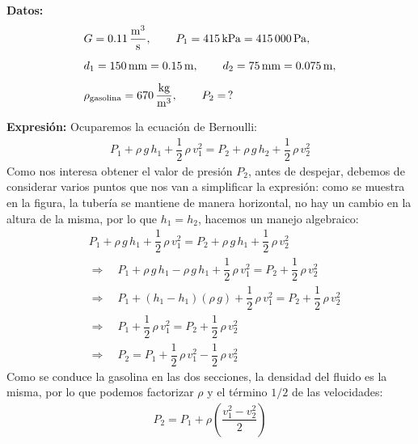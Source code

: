 \documentclass[14pt]{extarticle}
\begin{document}
\begin{enumerate}
\textbf{Datos:} 
\begin{align*}
&G = \displaystyle \SI[per-mode=fraction]{0.11}{\cubic\meter\per\second}, \hspace{0.75cm} P_{1} = \SI{415}{\kilo\pascal} = \SI{415000}{\pascal}, \\[0.5em]
&d_{1} = \SI{150}{\milli\meter} = \SI{0.15}{\meter}, \hspace{0.75cm} d_{2} = \SI{75}{\milli\meter} = \SI{0.075}{\meter}, \\[0.5em]
&\rho_{\text{gasolina}} = \SI[per-mode=fraction]{670}{\kilo\gram\per\cubic\meter}, \hspace{0.75cm} P_{2} = \, ?
\end{align*}

\textbf{Expresión: } Ocuparemos la ecuación de Bernoulli:
\begin{align*}
P_{1} + \rho \, g \, h_{1} + \dfrac{1}{2} \, \rho \, v_{1}^{2} = P_{2} + \rho \, g \, h_{2} + \dfrac{1}{2} \, \rho \, v_{2}^{2}
\end{align*}
Como nos interesa obtener el valor de presión $P_{2}$, antes de despejar, debemos de considerar varios puntos que nos van a simplificar la expresión: como se muestra en la figura, la tubería se mantiene de manera horizontal, no hay un cambio en la altura de la misma, por lo que $h_{1} = h_{2}$, hacemos un manejo algebraico:
\begin{align*}
&P_{1} + \rho \, g \, h_{1} + \dfrac{1}{2} \, \rho \, v_{1}^{2} = P_{2} + \rho \, g \, h_{1} + \dfrac{1}{2} \, \rho \, v_{2}^{2} \\[0.5em]
&\Rightarrow \quad P_{1} + \rho \, g \, h_{1} - \rho \, g \, h_{1} + \dfrac{1}{2} \, \rho \, v_{1}^{2} = P_{2}  + \dfrac{1}{2} \, \rho \, v_{2}^{2} \\[0.5em]
&\Rightarrow \quad P_{1} + (h_{1} - h_{1}) (\rho \, g ) + \dfrac{1}{2} \, \rho \, v_{1}^{2} = P_{2}  + \dfrac{1}{2} \, \rho \, v_{2}^{2} \\[0.5em]
&\Rightarrow \quad P_{1} + \dfrac{1}{2} \, \rho \, v_{1}^{2} = P_{2}  + \dfrac{1}{2} \, \rho \, v_{2}^{2} \\[0.5em]
&\Rightarrow \quad P_{2} = P_{1} + \dfrac{1}{2} \, \rho \, v_{1}^{2} - \dfrac{1}{2} \, \rho \, v_{2}^{2}
\end{align*}
Como se conduce la gasolina en las dos secciones, la densidad del fluido es la misma, por lo que podemos factorizar $\rho$ y el término $1/2$ de las velocidades:
\begin{align*}
P_{2} = P_{1} +  \rho \left( \dfrac{v_{1}^{2} - v_{2}^{2}}{2} \right)

\end{align*}
\end{enumerate}
\end{document}
